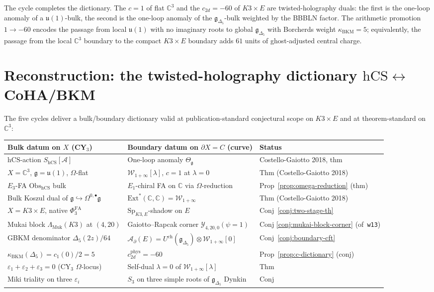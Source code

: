 \documentclass[11pt]{article}
\providecommand{\Eone}{E_1}
\providecommand{\Ethree}{E_3}
\providecommand{\C}{\mathbb{C}}
\providecommand{\cA}{\mathcal{A}}
\providecommand{\cW}{\mathcal{W}}
\providecommand{\cY}{\mathcal{Y}}
\providecommand{\fg}{\mathfrak{g}}
\providecommand{\fu}{\mathfrak{u}}
\providecommand{\hCS}{\mathrm{hCS}}
\providecommand{\Obs}{\mathrm{Obs}}
\providecommand{\Sp}{\mathrm{Sp}}
\providecommand{\BKM}{\mathrm{BKM}}
\providecommand{\Muk}{\mathrm{Muk}}
\begin{document}
The cycle completes the dictionary. The $c = 1$ of flat $\C^3$ and the
$c_{2d} = -60$ of $K3\times E$ are twisted-holography duals: the first
is the one-loop anomaly of a $\fu(1)$-bulk, the second is the one-loop
anomaly of the $\fg_{\Delta_5}$-bulk weighted by the BBBLN factor. The
arithmetic promotion $1 \to -60$ encodes the passage from local
$\fu(1)$ with no imaginary roots to global $\fg_{\Delta_5}$ with Borcherds
weight $\kappa_{\BKM} = 5$; equivalently, the passage from the local
$\C^3$ boundary to the compact $K3\times E$ boundary adds $61$ units of
ghost-adjusted central charge.

\section{Reconstruction: the twisted-holography dictionary
  $\hCS \leftrightarrow$ CoHA/BKM}
\label{sec:reconstruction}

The five cycles deliver a bulk/boundary dictionary valid at
publication-standard conjectural scope on $K3\times E$ and at
theorem-standard on $\C^3$:

\begin{center}
\begin{tabular}{l|l|l}
Bulk datum on $X$ (CY$_3$) & Boundary datum on $\partial X = C$ (curve) & Status\\
\hline
$\hCS$-action $S_{\hCS}[\cA]$ & One-loop anomaly $\Theta_\fg$ &
Costello-Gaiotto 2018, thm\\
$X = \C^3$, $\fg = \fu(1)$, $\Omega$-flat & $\cW_{1+\infty}[\lambda]$,
$c = 1$ at $\lambda = 0$ & Thm (Costello-Gaiotto 2018)\\
$\Ethree$-FA $\Obs_{\hCS}$ bulk & $\Eone$-chiral FA on $\C$ via
$\Omega$-reduction & Prop~\ref{prop:omega-reduction} (thm)\\
Bulk Koszul dual of $\fg \hookrightarrow \Omega^{0,\bullet}\fg$ &
$\mathrm{Ext}^*(\C, \C) = \cW_{1+\infty}$ & Thm (Costello-Gaiotto 2018)\\
$X = K3\times E$, native $\Phi^{\mathrm{FA}}_3$ & $\Sp_{K3,E}$-shadow
on $E$ & Conj~\ref{conj:two-stage-th}\\
Mukai block $\Lambda_\Muk(K3)$ at $(4,20)$ &
Gaiotto--Rapcak corner $\cY_{4,20,0}(\psi=1)$ & Conj
\ref{conj:mukai-block-corner} (of~\texttt{w13})\\
GBKM denominator $\Delta_5(2z)/64$ &
$\cA_\partial(E) = U^{\mathrm{ch}}(\fg_{\Delta_5})\otimes\cW_{1+\infty}[0]$ &
Conj~\ref{conj:boundary-cft}\\
$\kappa_{\BKM}(\Delta_5) = c_1(0)/2 = 5$ &
$c_{2d}^{\mathrm{phys}} = -60$ & Prop~\ref{prop:c-dictionary} (conj)\\
$\varepsilon_1+\varepsilon_2+\varepsilon_3 = 0$ (CY$_3$ $\Omega$-locus) &
Self-dual $\lambda = 0$ of $\cW_{1+\infty}[\lambda]$ & Thm\\
Miki triality on three $\varepsilon_i$ &
$S_3$ on three simple roots of $\fg_{\Delta_5}$ Dynkin & Conj\\
\end{tabular}
\end{center}
\end{document}
